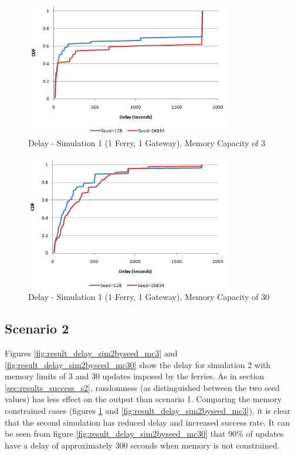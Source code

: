 \begin{figure}[htbp]
    \centering
    \includegraphics[width=0.8\textwidth]{images/result_delay_sim1byseed_mc3}
    \caption{Delay - Simulation 1 (1 Ferry, 1 Gateway), Memory Capacity of 3}
    \label{fig:result_delay_sim1byseed_mc3}
\end{figure}


\begin{figure}[htbp]
    \centering
    \includegraphics[width=0.8\textwidth]{images/result_delay_sim1byseed_mc30}
    \caption{Delay - Simulation 1 (1 Ferry, 1 Gateway), Memory Capacity of 30}
    \label{fig:result_delay_sim1byseed_mc30}
\end{figure}

\subsection{Scenario 2}

Figures \ref{fig:result_delay_sim2byseed_mc3} and \ref{fig:result_delay_sim2byseed_mc30} show the delay for simulation 2 with memory limits of 3 and 30 updates imposed by the ferries.
As in section \ref{sec:results_success_s2}, randomness (as distinguished between the two seed values) has less effect on the output than scenario 1.
Comparing the memory constrained cases (figures \ref{fig:result_delay_sim1byseed_mc3} and \ref{fig:result_delay_sim2byseed_mc3}), it is clear that the second simulation has reduced delay and increased success rate.
It can be seen from figure \ref{fig:result_delay_sim2byseed_mc30} that 90\% of updates have a delay of approximately 300 seconds when memory is not constrained.

